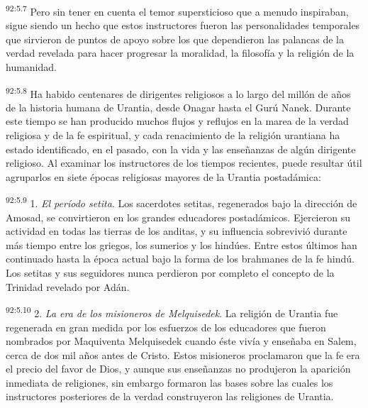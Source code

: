 \documentclass[twoside, 11pt]{book}
\begin{document}
\par
\textsuperscript{92:5.7} Pero sin tener en cuenta el temor supersticioso que a menudo inspiraban, sigue siendo un hecho que estos instructores fueron las personalidades temporales que sirvieron de puntos de apoyo sobre los que dependieron las palancas de la verdad revelada para hacer progresar la moralidad, la filosofía y la religión de la humanidad.

\par
\textsuperscript{92:5.8} Ha habido centenares de dirigentes religiosos a lo largo del millón de años de la historia humana de Urantia, desde Onagar hasta el Gurú Nanek. Durante este tiempo se han producido muchos flujos y reflujos en la marea de la verdad religiosa y de la fe espiritual, y cada renacimiento de la religión urantiana ha estado identificado, en el pasado, con la vida y las enseñanzas de algún dirigente religioso. Al examinar los instructores de los tiempos recientes, puede resultar útil agruparlos en siete épocas religiosas mayores de la Urantia postadámica:

\par
\textsuperscript{92:5.9} 1. \textit{El período setita}. Los sacerdotes setitas, regenerados bajo la dirección de Amosad, se convirtieron en los grandes educadores postadámicos. Ejercieron su actividad en todas las tierras de los anditas, y su influencia sobrevivió durante más tiempo entre los griegos, los sumerios y los hindúes. Entre estos últimos han continuado hasta la época actual bajo la forma de los brahmanes de la fe hindú. Los setitas y sus seguidores nunca perdieron por completo el concepto de la Trinidad revelado por Adán.

\par
\textsuperscript{92:5.10} 2. \textit{La era de los misioneros de Melquisedek}. La religión de Urantia fue regenerada en gran medida por los esfuerzos de los educadores que fueron nombrados por Maquiventa Melquisedek cuando éste vivía y enseñaba en Salem, cerca de dos mil años antes de Cristo. Estos misioneros proclamaron que la fe era el precio del favor de Dios, y aunque sus enseñanzas no produjeron la aparición inmediata de religiones, sin embargo formaron las bases sobre las cuales los instructores posteriores de la verdad construyeron las religiones de Urantia.
\end{document}
